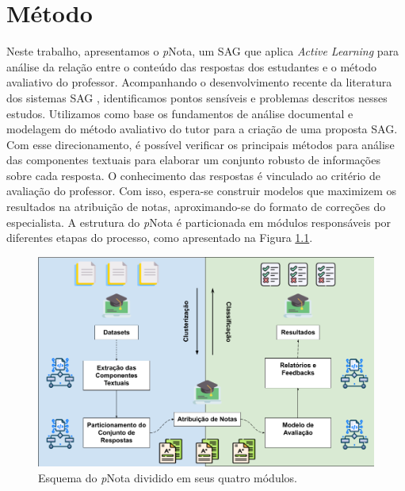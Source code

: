 \chapter{Método}
\label{cap-metodo}

Neste trabalho, apresentamos o \textit{p}Nota, um SAG que aplica \textit{Active Learning} para análise da relação entre o conteúdo das respostas dos estudantes e o método avaliativo do professor. Acompanhando o desenvolvimento recente da literatura dos sistemas SAG \cite{burrows2015, bonthu2021, haller2022}, identificamos pontos sensíveis e problemas descritos nesses estudos. Utilizamos como base os fundamentos de análise documental e modelagem do método avaliativo do tutor para a criação de uma proposta SAG. Com esse direcionamento, é possível verificar os principais métodos para análise das componentes textuais para elaborar um conjunto robusto de informações sobre cada resposta. O conhecimento das respostas é vinculado ao critério de avaliação do professor. Com isso, espera-se construir modelos que maximizem os resultados na atribuição de notas, aproximando-se do formato de correções do especialista. A estrutura do \textit{p}Nota é particionada em módulos responsáveis por diferentes etapas do processo, como apresentado na Figura \ref{fig-esquema}.

\begin{figure}[!h]
\centering
\includegraphics[width=\textwidth]{figuras/estrutura-pNota.png}
\caption{Esquema do \textit{p}Nota dividido em seus quatro módulos.}
\label{fig-esquema}
\end{figure}


